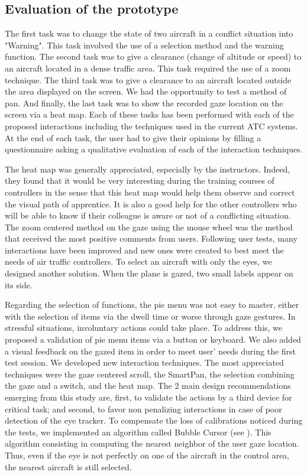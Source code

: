 \subsection{Evaluation of the prototype}
The first task was to change the state of two aircraft in a
conflict situation into "Warning". This task involved the use
of a selection method and the warning function. The second
task was to give a clearance (change of altitude or speed) to
an aircraft located in a dense traffic area. This task required
the use of a zoom technique. The third task was to give a
clearance to an aircraft located outside the area displayed on
the screen. We had the opportunity to test a method of pan.
And finally, the last task was to show the recorded gaze
location on the screen via a heat map.
Each of these tasks has been performed with each of the
proposed interactions including the techniques used in the
current ATC systems. At the end of each task, the user had
to give their opinions by filling a questionnaire asking a
qualitative evaluation of each of the interaction techniques.

The heat map was generally appreciated, especially by the
instructors. Indeed, they found that it would be very
interesting during the training courses of controllers in the
sense that this heat map would help them observe and
correct the visual path of apprentice. It is also a good help
for the other controllers who will be able to know if their
colleague is aware or not of a conflicting situation. The
zoom centered method on the gaze using the mouse wheel
was the method that received the most positive comments
from users.
Following user tests, many interactions have been improved
and new ones were created to best meet the needs of air
traffic controllers. To select an aircraft with only the eyes,
we designed another solution. When the plane is gazed, two
small labels appear on its side.

Regarding the selection of functions, the pie menu was not
easy to master, either with the selection of items via the
dwell time or worse through gaze gestures. In stressful
situations, involuntary actions could take place. To address
this, we proposed a validation of pie menu items via a button
or keyboard. We also added a visual feedback on the gazed
item in order to meet user' needs during the first test
session.
We developed new interaction techniques. The most appreciated
techniques were the gaze centered scroll, the SmartPan, the
selection combining the gaze and a switch, and the heat
map. The 2 main design recommendations emerging from
this study are, first, to validate the actions by a third device
for critical task; and second, to favor non penalizing
interactions in case of poor detection of the eye tracker. To compensate the loss of calibrations noticed during the
tests, we implemented an algorithm called Bubble Cursor  (see
\cite{Grossman:2005:BCE:1054972.1055012}). This algorithm consisting in computing the nearest
neighbor of the user gaze location. Thus, even if the eye is
not perfectly on one of the aircraft in the control area, the
nearest aircraft is still selected.



